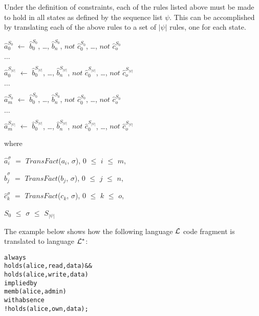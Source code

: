 \documentclass[global,twocolumn,draft]{svjour}
\newenvironment{vquote}
  {\begin{list}{}{\leftmargin 1em}\item[]}
  {\end{list}}
\newenvironment{vverbatim}
  {\begin{alltt}}
  {\vspace{-\baselineskip}\end{alltt}}
\begin{document}
          Under the definition of constraints, each of the rules listed above
          must be made to hold in all states as defined by the sequence list
          $\psi$. This can be accomplished by translating each of the above
          rules to a set of $|\psi|$ rules, one for each state.

           \begin{vquote}
            $\hat{a}^{S_{0}}_{0}$ $\leftarrow$
            $\hat{b}^{S_{0}}_{0}$, \ldots, $\hat{b}^{S_{0}}_{n}$,
            $not$ $\hat{c}^{S_{0}}_{0}$, \ldots, $not$ $\hat{c}^{S_{0}}_{o}$

            $\ldots$

            $\hat{a}^{S_{|\psi|}}_{0}$ $\leftarrow$
            $\hat{b}^{S_{|\psi|}}_{0}$, \ldots, $\hat{b}^{S_{|\psi|}}_{n}$,
            $not$ $\hat{c}^{S_{|\psi|}}_{0}$, \ldots, $not$ $\hat{c}^{S_{|\psi|}}_{o}$

            $\ldots$

            $\hat{a}^{S_{0}}_{m}$ $\leftarrow$
            $\hat{b}^{S_{0}}_{0}$, \ldots, $\hat{b}^{S_{0}}_{n}$,
            $not$ $\hat{c}^{S_{0}}_{0}$, \ldots, $not$ $\hat{c}^{S_{0}}_{o}$

            $\ldots$

            $\hat{a}^{S_{|\psi|}}_{m}$ $\leftarrow$
            $\hat{b}^{S_{|\psi|}}_{0}$, \ldots, $\hat{b}^{S_{|\psi|}}_{n}$,
            $not$ $\hat{c}^{S_{|\psi|}}_{0}$, \ldots, $not$ $\hat{c}^{S_{|\psi|}}_{o}$

            where

            $\hat{a}^{\sigma}_{i}$ $=$ $TransFact$($a_{i}$, $\sigma$),
            $0$ $\leq$ $i$ $\leq$ $m$,

            $\hat{b}^{\sigma}_{j}$ $=$ $TransFact$($b_{j}$, $\sigma$),
            $0$ $\leq$ $j$ $\leq$ $n$,

            $\hat{c}^{\sigma}_{k}$ $=$ $TransFact$($c_{k}$, $\sigma$),
            $0$ $\leq$ $k$ $\leq$ $o$,

            $S_{0}$ $\leq$ $\sigma$ $\leq$ $S_{|\psi|}$
          \end{vquote}

          The example below shows how the following language ${\cal L}$ code
          fragment is translated to language ${\cal L}^{*}$:

          \begin{vverbatim}
  always
    holds(alice, read, data) &&
    holds(alice, write, data)
  implied by
    memb(alice, admin)
  with absence
    !holds(alice, own, data);
          \end{vverbatim}
\end{document}
